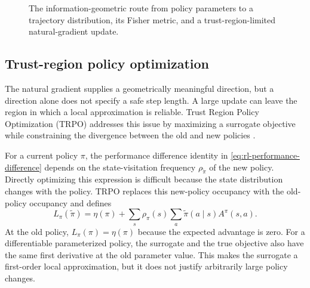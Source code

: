 \begin{figure}[htbp]
    \centering
    \resizebox{\textwidth}{!}{}
    \caption{The information-geometric route from policy parameters to a
    trajectory distribution, its Fisher metric, and a trust-region-limited
    natural-gradient update.}
    \label{fig:rl-information-geometry}
\end{figure}

\subsection{Trust-region policy optimization}
\label{subsec:rl-trust-region-policy-optimization}

The natural gradient supplies a geometrically meaningful direction, but a
direction alone does not specify a safe step length. A large update can leave
the region in which a local approximation is reliable. Trust Region Policy
Optimization (TRPO) addresses this issue by maximizing a surrogate objective
while constraining the divergence between the old and new policies
\parencite{schulman2015trpo}.

For a current policy $\pi$, the performance difference identity in
\cref{eq:rl-performance-difference} depends on the state-visitation frequency
$\rho_{\widetilde\pi}$ of the new policy. Directly optimizing this expression
is difficult because the state distribution changes with the policy. TRPO
replaces this new-policy occupancy with the old-policy occupancy and defines
\begin{equation}
    L_\pi(\widetilde\pi)
    =\eta(\pi)
     +\sum_s\rho_\pi(s)
       \sum_a\widetilde\pi(a\mid s)A^\pi(s,a).
    \label{eq:rl-trpo-surrogate}
\end{equation}
At the old policy, $L_\pi(\pi)=\eta(\pi)$ because the expected advantage is
zero. For a differentiable parameterized policy, the surrogate and the true
objective also have the same first derivative at the old parameter value.
This makes the surrogate a first-order local approximation, but it does not
justify arbitrarily large policy changes.

